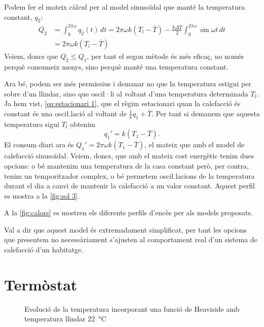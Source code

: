 \documentclass[12pt]{article}
\numberwithin{table}{section}
\numberwithin{figure}{section}
\numberwithin{equation}{section}
\begin{document}
Podem fer el mateix càlcul per al model sinusoïdal que manté la temperatura constant, \( q_2 \):
\begin{equation} \label{eq:consum 2}
	\begin{aligned}
		Q_2 & = \int_0^{2\pi \omega} q_2(t) \, dt = 2\pi\omega k(T_l - \bar{T}) - \frac{k \Delta T}{2} \int_0^{2\pi \omega} \sin{\omega t} \, dt \\
				& = 2\pi\omega k(T_l - \bar{T})
	\end{aligned}
\end{equation}
Veiem, doncs que \( Q_2 \leq Q_1 \), per tant el segon mètode és més eficaç, no només perquè consumeix menys, sino perquè manté una temperatura constant. 

Ara bé, podem ser més permissius i demanar no que la temperatura estigui per sobre d'un llindar, sino que oscil·li al voltant d'una temperatura determinada \( T_l \). Ja hem vist, \cref{eq:estacionari 1}, que el règim estacionari quan la calefacció és constant és una osci\l.lació al voltant de \( \frac{1}{k}q_1 + \bar{T} \). Per tant si demanem que aquesta temperatura sigui \( T_l \) obtenim
\begin{equation*}
	q_1' = k(T_1 - \bar{T}).
\end{equation*}
El consum diari ara és \( Q_1' = 2\pi\omega k(T_1 - \bar{T}) \), el mateix que amb el model de calefacció sinusoïdal. Veiem, doncs, que amb el mateix cost energètic tenim dues opcions: o bé mantenim una temperatura de la casa constant però, per contra, tenim un temporitzador complex, o bé permetem osci\l.lacions de la temperatura durant el dia a canvi de mantenir la calefacció a un valor constant. Aquest perfil es mostra a la \cref{fig:sol 3}.

A la \cref{fig:calors} es mostren els diferents perfils d'encès per als models proposats.

Val a dir que aquest model és extremadament simplificat, per tant les opcions que presentem no necessàriament s'ajusten al comportament real d'un sistema de calefacció d'un habitatge. 

\section{Termòstat}
\begin{figure}[tb]
	\small \sffamily \centering
	
	\caption{Evolució de la temperatura incorporant una funció de Heaviside amb temperatura llindar \SI{22}{\celsius}}
	\label{fig:sol 4}
\end{figure}
\end{document}
